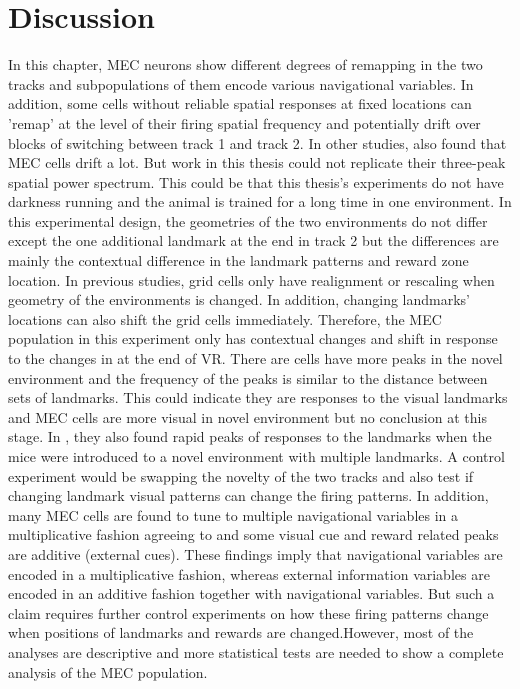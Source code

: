 \section{Discussion}
In this chapter, MEC neurons show different degrees of remapping in the two tracks and subpopulations of them encode various navigational variables. In addition, some cells without reliable spatial responses at fixed locations can 'remap' at the level of their firing spatial frequency and potentially drift over blocks of switching between track 1 and track 2. In other studies, \cite{wen_one-shot_2024} also found that MEC cells drift a lot. But work in this thesis could not replicate their three-peak spatial power spectrum. This could be that this thesis's experiments do not have darkness running and the animal is trained for a long time in one environment. In this experimental design, the geometries of the two environments do not differ except the one additional landmark at the end in track 2 but the differences are mainly the contextual difference in the landmark patterns and reward zone location. In previous studies, grid cells only have realignment or rescaling when geometry of the environments is changed. In addition, changing landmarks' locations can also shift the grid cells immediately. Therefore, the MEC population in this experiment only has contextual changes and shift in response to the changes in at the end of VR. There are cells have more peaks in the novel environment and the frequency of the peaks is similar to the distance between sets of landmarks. This could indicate they are responses to the visual landmarks and MEC cells are more visual in novel environment but no conclusion at this stage. In \cite{wen_one-shot_2024}, they also found rapid peaks of responses to the landmarks when the mice were introduced to a novel environment with multiple landmarks. A control experiment would be swapping the novelty of the two tracks and also test if changing landmark visual patterns can change the firing patterns. In addition, many MEC cells are found to tune to multiple navigational variables in a multiplicative fashion agreeing to \cite{hardcastle_multiplexed_2017} and some visual cue and reward related peaks are additive (external cues). These findings imply that navigational variables are encoded in a multiplicative fashion, whereas external information variables are encoded in an additive fashion together with navigational variables. But such a claim requires further control experiments on how these firing patterns change when positions of landmarks and rewards are changed.However, most of the analyses are descriptive and more statistical tests are needed to show a complete analysis of the MEC population. 

